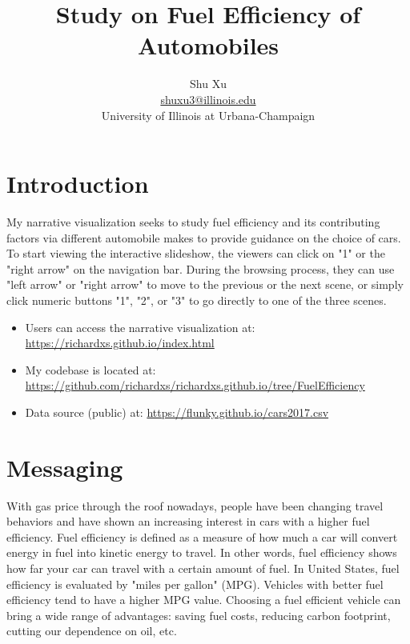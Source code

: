 \documentclass[11pt]{article}
\title {Study on Fuel Efficiency of Automobiles }
\author{ Shu Xu \\ \href{mailto:shuxu3@illinois.edu}{shuxu3@illinois.edu} \\ University of Illinois at Urbana-Champaign}
\begin{document}
\maketitle

\section{Introduction}
My narrative visualization seeks to study fuel efficiency and its contributing factors via different automobile makes to provide guidance on the choice of cars. To start viewing the interactive slideshow, the viewers can click on "1" or the "right arrow" on the navigation bar. During the browsing process, they can use "left arrow" or "right arrow" to move to the previous or the next scene, or simply click numeric buttons "1", "2", or "3" to go directly to one of the three scenes. 

\begin{itemize}
	\item Users can access the narrative visualization at: \url{https://richardxs.github.io/index.html} \\
	\item My codebase is located at: \url{https://github.com/richardxs/richardxs.github.io/tree/FuelEfficiency} \\
	\item Data source (public)  at: \url{https://flunky.github.io/cars2017.csv}
\end{itemize}


\section{Messaging}
With gas price through the roof nowadays, people have been changing travel behaviors and have shown an increasing interest in cars with a higher fuel efficiency. Fuel efficiency is defined as a measure of how much a car will convert energy in fuel into kinetic energy to travel. In other words, fuel efficiency shows how far your car can travel with a certain amount of fuel. In United States, fuel efficiency is evaluated by "miles per gallon" (MPG). Vehicles with better fuel efficiency tend to have a higher MPG value. Choosing a fuel efficient vehicle can bring a wide range of advantages: saving fuel costs, reducing carbon footprint, cutting our dependence on oil, etc. 
\end{document}
